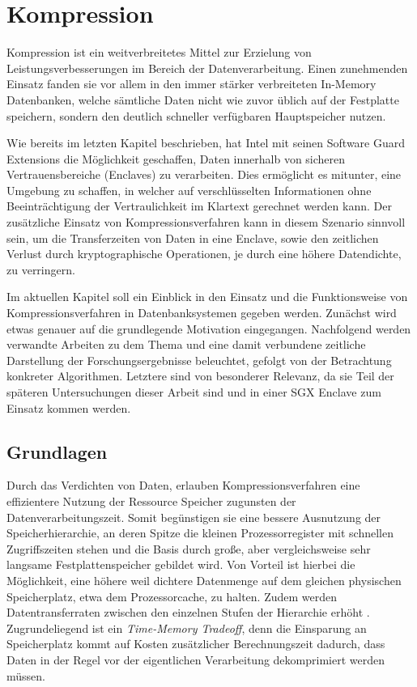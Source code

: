
\chapter{Kompression}

Kompression ist ein weitverbreitetes Mittel zur Erzielung von Leistungsverbesserungen im Bereich der Datenverarbeitung. Einen zunehmenden Einsatz fanden sie vor allem in den immer stärker verbreiteten In-Memory Datenbanken, welche sämtliche Daten nicht wie zuvor üblich auf der Festplatte speichern, sondern den deutlich schneller verfügbaren Hauptspeicher nutzen.

Wie bereits im letzten Kapitel beschrieben, hat Intel mit seinen Software Guard Extensions die Möglichkeit geschaffen, Daten innerhalb von sicheren Vertrauensbereiche (Enclaves) zu verarbeiten. Dies ermöglicht es mitunter, eine Umgebung zu schaffen, in welcher auf verschlüsselten Informationen ohne Beeinträchtigung der Vertraulichkeit im Klartext gerechnet werden kann. Der zusätzliche Einsatz von Kompressionsverfahren kann in diesem Szenario sinnvoll sein, um die Transferzeiten von Daten in eine Enclave, sowie den zeitlichen Verlust durch kryptographische Operationen, je durch eine höhere Datendichte, zu verringern.

Im aktuellen Kapitel soll ein Einblick in den Einsatz und die Funktionsweise von Kompressionsverfahren in Datenbanksystemen gegeben werden. Zunächst wird etwas genauer auf die grundlegende Motivation eingegangen. Nachfolgend werden verwandte Arbeiten zu dem Thema und eine damit verbundene zeitliche Darstellung der Forschungsergebnisse beleuchtet, gefolgt von der Betrachtung konkreter Algorithmen. Letztere sind von besonderer Relevanz, da sie Teil der späteren Untersuchungen dieser Arbeit sind und in einer \ac{SGX} Enclave zum Einsatz kommen werden.

\section{Grundlagen}

Durch das Verdichten von Daten, erlauben Kompressionsverfahren eine effizientere Nutzung der Ressource Speicher zugunsten der Datenverarbeitungszeit. Somit begünstigen sie eine bessere Ausnutzung der Speicherhierarchie, an deren Spitze die kleinen Prozessorregister mit schnellen Zugriffszeiten stehen und die Basis durch große, aber vergleichsweise sehr langsame Festplattenspeicher gebildet wird. Von Vorteil ist hierbei die Möglichkeit, eine höhere weil dichtere Datenmenge auf dem gleichen physischen Speicherplatz, etwa dem Prozessorcache, zu halten. Zudem werden Datentransferraten zwischen den einzelnen Stufen der Hierarchie erhöht \cite{Croft2009}. Zugrundeliegend ist ein \textit{Time-Memory Tradeoff}, denn die Einsparung an Speicherplatz kommt auf Kosten zusätzlicher Berechnungszeit dadurch, dass Daten in der Regel vor der eigentlichen Verarbeitung dekomprimiert werden müssen.

